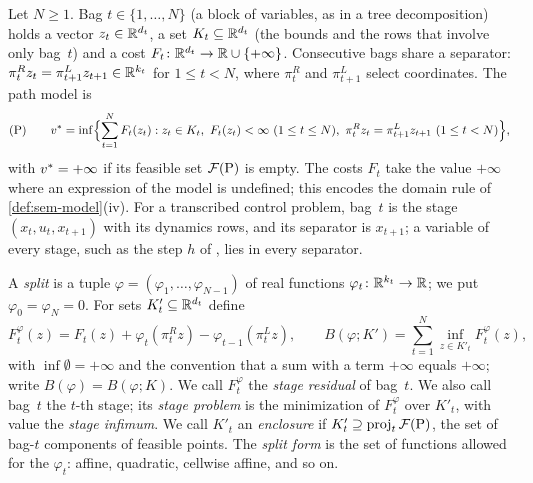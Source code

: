 Let $N\ge1$.
Bag $t\in\{1,\dots,N\}$ (a block of variables, as in a tree decomposition) holds a vector $z_t\in\R^{d_t}$, a set $K_t\subseteq\R^{d_t}$ (the bounds and the rows that involve only bag~$t$) and a cost $F_t\colon\R^{d_t}\to\R\cup\{+\infty\}$.
Consecutive bags share a separator: $\pi^R_tz_t=\pi^L_{t+1}z_{t+1}\in\R^{k_t}$ for $1\le t<N$, where $\pi^R_t$ and $\pi^L_{t+1}$ select coordinates.
The path model is
\begin{equation}\label{eq:split-path}
  \text{(P)}\qquad
  \vstar=\inf\Bigl\{\sum_{t=1}^NF_t(z_t) : z_t\in K_t,\ F_t(z_t)<\infty\ (1\le t\le N),\ \pi^R_tz_t=\pi^L_{t+1}z_{t+1}\ (1\le t<N)\Bigr\},
\end{equation}
with $\vstar=+\infty$ if its feasible set $\feas[\mathrm P]$ is empty.
The costs $F_t$ take the value $+\infty$ where an expression of the model is undefined; this encodes the domain rule of \cref{def:sem-model}(iv).
For a transcribed control problem, bag~$t$ is the stage $(x_t,u_t,x_{t+1})$ with its dynamics rows, and its separator is $x_{t+1}$; a variable of every stage, such as the step $h$ of , lies in every separator.

A \emph{split} is a tuple $\varphi=(\varphi_1,\dots,\varphi_{N-1})$ of real functions $\varphi_t\colon\R^{k_t}\to\R$; we put $\varphi_0=\varphi_N=0$.
For sets $K'_t\subseteq\R^{d_t}$ define
\begin{equation}\label{eq:split-bound}
  F^\varphi_t(z)=F_t(z)+\varphi_t(\pi^R_tz)-\varphi_{t-1}(\pi^L_tz),
  \qquad
  B(\varphi;K')=\sum_{t=1}^N\inf_{z\in K'_t}F^\varphi_t(z),
\end{equation}
with $\inf\emptyset=+\infty$ and the convention that a sum with a term $+\infty$ equals $+\infty$; write $B(\varphi)=B(\varphi;K)$.
We call $F^\varphi_t$ the \emph{stage residual} of bag~$t$.
We also call bag~$t$ the $t$-th stage; its \emph{stage problem} is the minimization of $F^\varphi_t$ over $K'_t$, with value the \emph{stage infimum}.
We call $K'_t$ an \emph{enclosure} if $K'_t\supseteq\proj_t\feas[\mathrm P]$, the set of bag-$t$ components of feasible points.
The \emph{split form} is the set of functions allowed for the $\varphi_t$: affine, quadratic, cellwise affine, and so on.

